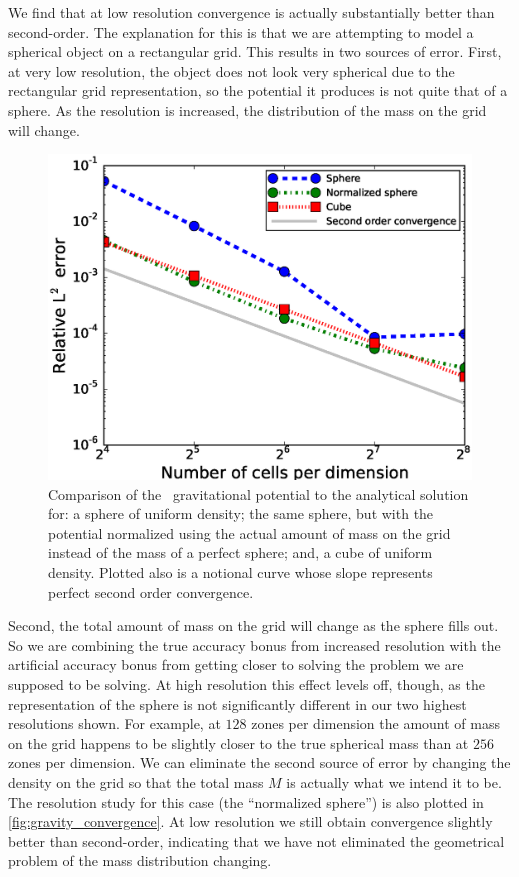 \documentclass[12pt]{article}
\begin{document}
We find that at low resolution convergence is actually substantially better
than second-order. The explanation for this is that we are attempting to
model a spherical object on a rectangular grid. This results in two sources of error.
First, at very low resolution, the object does not look very spherical due to the rectangular
grid representation, so the potential it produces is not quite that of a sphere.
As the resolution is increased, the distribution of the mass on the grid will change.
\begin{figure}[h!]
  \centering
  \includegraphics[scale=0.85,trim=0.075in 0.0in 0.7in 0.0in,clip]{plots/phi_comparison}
  \caption[Analytical versus numerical solution of the potential]
          {Comparison of the \castro\ gravitational potential to the analytical solution for:
           a sphere of uniform density; the same sphere, but with the potential normalized using the
           actual amount of mass on the grid instead of the mass of a perfect sphere; and, a
           cube of uniform density. Plotted also is a notional curve whose slope represents
           perfect second order convergence.\label{fig:gravity_convergence}}
\end{figure}
Second, the total amount of mass on the grid will change as the sphere fills out.
So we are combining the true accuracy bonus from increased resolution
with the artificial accuracy bonus from getting closer to solving the problem
we are supposed to be solving. At high resolution this effect levels off, though,
as the representation of the sphere is not significantly different in
our two highest resolutions shown. For example, at $128$ zones per dimension
the amount of mass on the grid happens to be slightly closer to the true spherical
mass than at $256$ zones per dimension.
We can eliminate the second source of error by changing the density on
the grid so that the total mass $M$ is actually what we intend it to be.
The resolution study for this case (the ``normalized sphere'') is also
plotted in \autoref{fig:gravity_convergence}. At low resolution we still obtain
convergence slightly better than second-order, indicating that we
have not eliminated the geometrical problem of the mass distribution changing.
\end{document}
